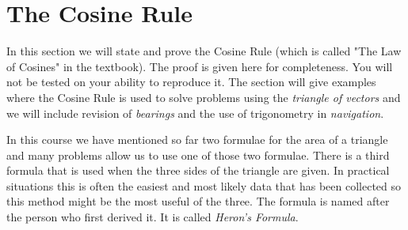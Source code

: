 %
%
%
%
%
%
%
%   
%
%
%
% 
%
%
% 

\section{The Cosine Rule}


In this section we will state and prove the Cosine Rule (which is called "The Law of Cosines" in the
textbook). The proof is given here for completeness. You will not
be tested on your ability to reproduce it. The section will give examples where the Cosine Rule is used to solve
problems using the \emph{triangle of vectors} and we will include revision of \emph{bearings} and the use of trigonometry
in \emph{navigation}. 

In this course we have mentioned so far two formulae for the area of a triangle and many problems
allow us to use one of those two formulae. There is a third formula that is used when the three sides of the
triangle are given. In practical situations this is often the easiest and most likely data that has been collected
so this method might be the most useful of the three. The formula is named after the person who first derived
it. It is called \emph{Heron's Formula}. 


